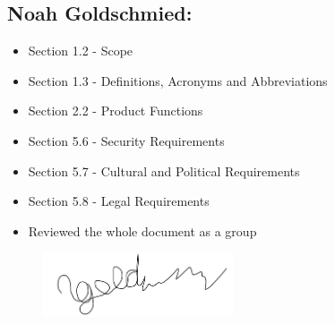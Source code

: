 \documentclass[]{article}
\begin{document}
\subsection*{Noah Goldschmied:}
\begin{itemize}
	\item Section 1.2 - Scope
	\item Section 1.3 - Definitions, Acronyms and Abbreviations
	\item Section 2.2 - Product Functions
	\item Section 5.6 - Security Requirements
	\item Section 5.7 - Cultural and Political Requirements
	\item Section 5.8 - Legal Requirements
	\item Reviewed the whole document as a group
\end{itemize}
\begin{figure}[h]
	\centering
	\includegraphics[width=0.5\textwidth]{NoahSignature.png}
	\label{fig:signature}
\end{figure}



\end{document}
